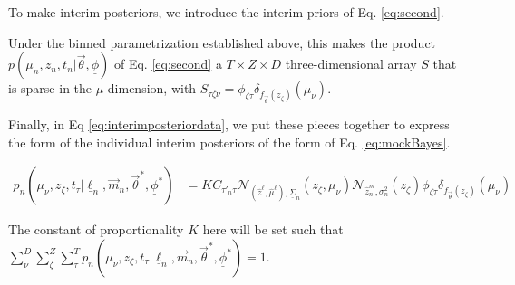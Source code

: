 \documentclass[12pt, onecolumn]{emulateapj}
\newcommand{\textul}{\underline}
\begin{document}
To make interim posteriors, we introduce the interim priors of Eq. \ref{eq:second}.

Under the binned parametrization established above, this makes the product $p(\mu_{n}, z_{n}, t_{n} | \vec{\theta}, \textul{\phi})$ of Eq. \ref{eq:second} a $T\times Z\times D$ three-dimensional array $\textul{S}$ that is sparse in the $\mu$ dimension, with $S_{\tau\zeta\nu}=\phi_{\zeta\tau}\delta_{f_{\vec{\theta}}(z_{\zeta})}(\mu_{\nu})$.

Finally, in Eq \ref{eq:interimposteriordata}, we put these pieces together to express the form of the individual interim posteriors of the form of Eq. \ref{eq:mockBayes}.

\begin{align}
\label{eq:interimposteriordata}
p_{n}(\mu_{\nu}, z_{\zeta}, t_{\tau} | \textul{\ell}_{n}, \vec{m}_{n}, \vec{\theta}^{*}, \textul{\phi}^{*}) &= KC_{\tau'_{n}\tau}\mathcal{N}_{(\hat{z}^{\ell}, \hat{\mu}^{\ell}), \textul{\Sigma}_{n}}(z_{\zeta}, \mu_{\nu}) \mathcal{N}_{\hat{z}_{n}^{m}, \sigma_{n}^{2}}(z_{\zeta}) \phi_{\zeta\tau}\delta_{f_{\vec{\theta}}(z_{\zeta})}(\mu_{\nu})
\end{align}

The constant of proportionality $K$ here will be set such that $\sum_{\nu}^{D}\sum_{\zeta}^{Z}\sum_{\tau}^{T} p_{n}(\mu_{\nu}, z_{\zeta}, t_{\tau} | \textul{\ell}_{n}, \vec{m}_{n}, \vec{\theta}^{*}, \textul{\phi}^{*})=1$.
\end{document}
